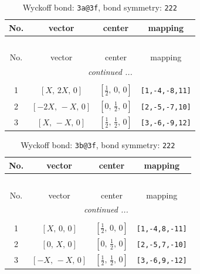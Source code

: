 \documentclass[fleqn,8pt]{jsarticle}
\begin{document}
\begin{longtable}{cccc}
\caption{Wyckoff bond: {\tt 3a@3f}, bond symmetry: {\tt 222}}
 \\
 \hline \hline
No. & vector & center & mapping \\ \hline \endfirsthead

\multicolumn{3}{l}{\tablename\ \thetable{}} \\
 \hline \hline
No. & vector & center & mapping \\ \hline \endhead

 \hline \hline
\multicolumn{3}{r}{\footnotesize\it continued ...} \\ \endfoot

 \hline \hline
\multicolumn{3}{r}{} \\ \endlastfoot

1 & $\left[ X,\, 2 X,\, 0 \right]$ & $\left[ \frac{1}{2},\, 0,\, 0 \right]$ & {\tt [1,-4,-8,11]} \\ \hline
2 & $\left[ - 2 X,\, - X,\, 0 \right]$ & $\left[ 0,\, \frac{1}{2},\, 0 \right]$ & {\tt [2,-5,-7,10]} \\ \hline
3 & $\left[ X,\, - X,\, 0 \right]$ & $\left[ \frac{1}{2},\, \frac{1}{2},\, 0 \right]$ & {\tt [3,-6,-9,12]} \\
\end{longtable}
\renewcommand{\arraystretch}{1.2}
\begin{longtable}{cccc}
\caption{Wyckoff bond: {\tt 3b@3f}, bond symmetry: {\tt 222}}
 \\
 \hline \hline
No. & vector & center & mapping \\ \hline \endfirsthead

\multicolumn{3}{l}{\tablename\ \thetable{}} \\
 \hline \hline
No. & vector & center & mapping \\ \hline \endhead

 \hline \hline
\multicolumn{3}{r}{\footnotesize\it continued ...} \\ \endfoot

 \hline \hline
\multicolumn{3}{r}{} \\ \endlastfoot

1 & $\left[ X,\, 0,\, 0 \right]$ & $\left[ \frac{1}{2},\, 0,\, 0 \right]$ & {\tt [1,-4,8,-11]} \\ \hline
2 & $\left[ 0,\, X,\, 0 \right]$ & $\left[ 0,\, \frac{1}{2},\, 0 \right]$ & {\tt [2,-5,7,-10]} \\ \hline
3 & $\left[ - X,\, - X,\, 0 \right]$ & $\left[ \frac{1}{2},\, \frac{1}{2},\, 0 \right]$ & {\tt [3,-6,9,-12]} \\
\end{longtable}
\end{document}
